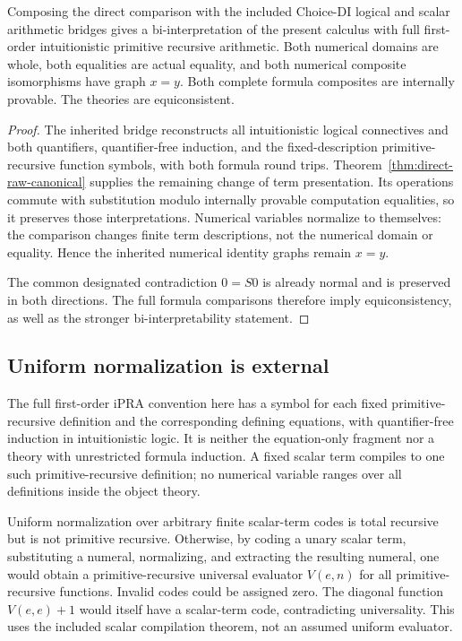 \begin{corollary}
\label{cor:nb-full-ipra}
Composing the direct comparison with the included Choice-DI logical and
scalar arithmetic bridges gives a bi-interpretation of the present
calculus with full first-order intuitionistic primitive recursive
arithmetic. Both numerical domains are whole, both equalities are
actual equality, and both numerical composite isomorphisms have graph
$x=y$. Both complete formula composites are internally provable.
The theories are equiconsistent.
\end{corollary}
\begin{proof}
The inherited bridge reconstructs all intuitionistic logical
connectives and both quantifiers, quantifier-free induction, and the
fixed-description primitive-recursive function symbols, with both
formula round trips. Theorem~\ref{thm:direct-raw-canonical} supplies
the remaining change of term presentation. Its operations commute
with substitution modulo internally provable computation equalities,
so it preserves those interpretations. Numerical variables normalize
to themselves: the comparison changes finite term descriptions,
not the numerical domain or equality. Hence the inherited numerical
identity graphs remain $x=y$.

The common designated contradiction $0=S0$ is already normal and
is preserved in both directions. The full formula comparisons
therefore imply equiconsistency, as well as the stronger
bi-interpretability statement.
\end{proof}

\subsection{Uniform normalization is external}

The full first-order iPRA convention here has a symbol for each fixed
primitive-recursive definition and the corresponding defining
equations, with quantifier-free induction in intuitionistic logic.
It is neither the equation-only fragment nor a theory with unrestricted
formula induction. A fixed scalar term compiles to one such
primitive-recursive definition; no numerical variable ranges over all
definitions inside the object theory.

Uniform normalization over arbitrary finite scalar-term codes is total
recursive but is not primitive recursive. Otherwise, by coding a unary
scalar term, substituting a numeral, normalizing, and extracting the
resulting numeral, one would obtain a primitive-recursive universal
evaluator $V(e,n)$ for all primitive-recursive functions. Invalid codes
could be assigned zero. The diagonal function $V(e,e)+1$ would itself
have a scalar-term code, contradicting universality. This uses the
included scalar compilation theorem, not an assumed uniform evaluator.

